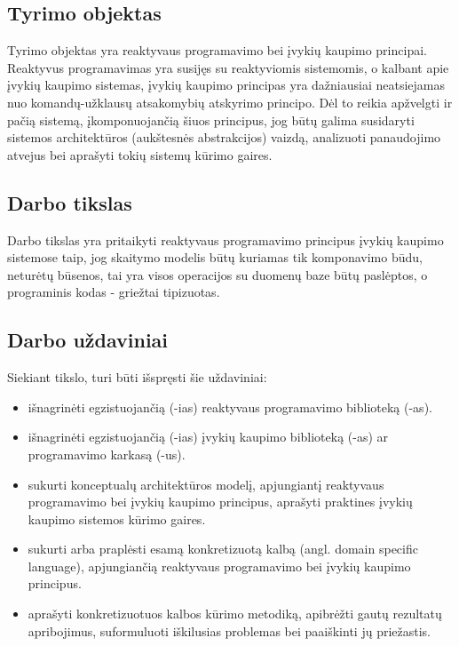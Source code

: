 \subsection{Tyrimo objektas}

    Tyrimo objektas yra reaktyvaus programavimo bei įvykių kaupimo principai. Reaktyvus programavimas yra susijęs su reaktyviomis sistemomis, o kalbant apie įvykių kaupimo sistemas, įvykių kaupimo principas yra dažniausiai neatsiejamas nuo komandų-užklausų atsakomybių atskyrimo principo. Dėl to reikia apžvelgti ir pačią sistemą, įkomponuojančią šiuos principus, jog būtų galima susidaryti sistemos architektūros (aukštesnės abstrakcijos) vaizdą, analizuoti panaudojimo atvejus bei aprašyti tokių sistemų kūrimo gaires.

\subsection{Darbo tikslas}

  Darbo tikslas yra pritaikyti reaktyvaus programavimo principus įvykių kaupimo sistemose taip, jog skaitymo modelis būtų kuriamas tik komponavimo būdu, neturėtų būsenos, tai yra visos operacijos su duomenų baze būtų paslėptos, o programinis kodas - griežtai tipizuotas.

\subsection{Darbo uždaviniai}

  Siekiant tikslo, turi būti išspręsti šie uždaviniai:

\begin{itemize}
  \item išnagrinėti egzistuojančią (-ias) reaktyvaus programavimo biblioteką (-as).
  \item išnagrinėti egzistuojančią (-ias) įvykių kaupimo biblioteką (-as) ar programavimo karkasą (-us).
  \item sukurti konceptualų architektūros modelį, apjungiantį reaktyvaus programavimo bei įvykių kaupimo principus, aprašyti praktines įvykių kaupimo sistemos kūrimo gaires.
  \item sukurti arba praplėsti esamą konkretizuotą kalbą (angl. domain specific language), apjungiančią reaktyvaus programavimo bei įvykių kaupimo principus.
  \item aprašyti konkretizuotuos kalbos kūrimo metodiką, apibrėžti gautų rezultatų apribojimus, suformuluoti iškilusias problemas bei paaiškinti jų priežastis.
\end{itemize}

